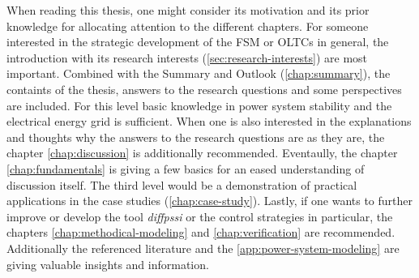 When reading this thesis, one might consider its motivation and its prior knowledge for allocating attention to the different chapters.
For someone interested in the strategic development of the \acs{FSM} or \acsp{OLTC} in general, the introduction with its research interests (\autoref{sec:research-interests}) are most important. 
Combined with the Summary and Outlook (\autoref{chap:summary}), the containts of the thesis, answers to the research questions and some perspectives are included.
For this level basic knowledge in power system stability and the electrical energy grid is sufficient.
When one is also interested in the explanations and thoughts why the answers to the research questions are as they are, the chapter \autoref{chap:discussion} is additionally recommended. Eventaully, the chapter \autoref{chap:fundamentals} is giving a few basics for an eased understanding of discussion itself.
The third level would be a demonstration of practical applications in the case studies (\autoref{chap:case-study}).
Lastly, if one wants to further improve or develop the tool {\itshape diffpssi} or the control strategies in particular, the chapters \autoref{chap:methodical-modeling} and \autoref{chap:verification} are recommended.
Additionally the referenced literature and the \autoref{app:power-system-modeling} are giving valuable insights and information.





